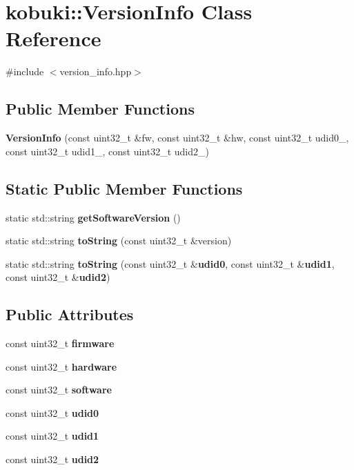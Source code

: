 \section{kobuki\-:\-:\-Version\-Info \-Class \-Reference}
\label{classkobuki_1_1VersionInfo}


{\ttfamily \#include $<$version\-\_\-info.\-hpp$>$}

\subsection*{\-Public \-Member \-Functions}
\begin{DoxyCompactItemize}
\item 
{\bf \-Version\-Info} (const uint32\-\_\-t \&fw, const uint32\-\_\-t \&hw, const uint32\-\_\-t udid0\-\_\-, const uint32\-\_\-t udid1\-\_\-, const uint32\-\_\-t udid2\-\_\-)
\end{DoxyCompactItemize}
\subsection*{\-Static \-Public \-Member \-Functions}
\begin{DoxyCompactItemize}
\item 
static std\-::string {\bf get\-Software\-Version} ()
\item 
static std\-::string {\bf to\-String} (const uint32\-\_\-t \&version)
\item 
static std\-::string {\bf to\-String} (const uint32\-\_\-t \&{\bf udid0}, const uint32\-\_\-t \&{\bf udid1}, const uint32\-\_\-t \&{\bf udid2})
\end{DoxyCompactItemize}
\subsection*{\-Public \-Attributes}
\begin{DoxyCompactItemize}
\item 
const uint32\-\_\-t {\bf firmware}
\item 
const uint32\-\_\-t {\bf hardware}
\item 
const uint32\-\_\-t {\bf software}
\item 
const uint32\-\_\-t {\bf udid0}
\item 
const uint32\-\_\-t {\bf udid1}
\item 
const uint32\-\_\-t {\bf udid2}
\end{DoxyCompactItemize}


